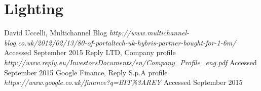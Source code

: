 \documentclass[titlepage]{article}
\begin{document}
\section{Lighting}





 \begin{thebibliography}{1}
 	
 	 David Uccelli, Multichannel Blog {\em http://www.multichannel-blog.co.uk/2012/02/13/80-of-portaltech-uk-hybris-partner-bought-for-1-6m/} Accessed September 2015
 	 Reply LTD, Company profile {\em http://www.reply.eu/InvestorsDocuments/en/Company\_Profile\_eng.pdf} Accessed September 2015
 	 Google Finance, Reply S.p.A profile {\em https://www.google.co.uk/finance?q=BIT\%3AREY} Accessed September 2015
 	
 	
 	
 	
 		

	


 \end{thebibliography}
\end{document}

